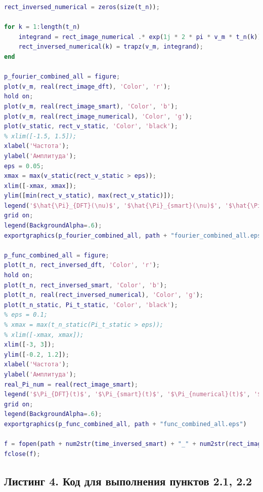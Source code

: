 \documentclass[a4paper]{article}
\begin{document}
\begin{lstlisting}[caption={Код для построения графиков для пункта 1.3}, language=matlab]
rect_inversed_numerical = zeros(size(t_n));

for k = 1:length(t_n)
    integrand = rect_image_numerical .* exp(1j * 2 * pi * v_m * t_n(k));
    rect_inversed_numerical(k) = trapz(v_m, integrand);
end

p_fourier_combined_all = figure;
plot(v_m, real(rect_image_dft), 'Color', 'r');
hold on;
plot(v_m, real(rect_image_smart), 'Color', 'b');
plot(v_m, real(rect_image_numerical), 'Color', 'g');
plot(v_static, rect_v_static, 'Color', 'black');
% xlim([-1.5, 1.5]);
xlabel('Частота');
ylabel('Амплитуда');
eps = 0.05;
xmax = max(v_static(rect_v_static > eps));
xlim([-xmax, xmax]);
ylim([min(rect_v_static), max(rect_v_static)]);
legend('$\hat{\Pi}_{DFT}(\nu)$', '$\hat{\Pi}_{smart}(\nu)$', '$\hat{\Pi}_{numerical}(\nu)$', '$\mathrm{sinc}(\pi\nu)$', 'Interpreter', 'latex', 'fontsize', 12)
grid on;
legend(BackgroundAlpha=.6);
exportgraphics(p_fourier_combined_all, path + "fourier_combined_all.eps")

p_func_combined_all = figure;
plot(t_n, rect_inversed_dft, 'Color', 'r');
hold on;
plot(t_n, rect_inversed_smart, 'Color', 'b');
plot(t_n, real(rect_inversed_numerical), 'Color', 'g');
plot(t_n_static, Pi_t_static, 'Color', 'black');
% eps = 0.1;
% xmax = max(t_n_static(Pi_t_static > eps));
% xlim([-xmax, xmax]);
xlim([-3, 3]);
ylim([-0.2, 1.2]);
xlabel('Частота');
ylabel('Амплитуда');
real_Pi_num = real(rect_image_smart);
legend('$\Pi_{DFT}(t)$', '$\Pi_{smart}(t)$', '$\Pi_{numerical}(t)$', '$\Pi(t)$', 'Interpreter', 'latex', 'fontsize', 12)
grid on;
legend(BackgroundAlpha=.6);
exportgraphics(p_func_combined_all, path + "func_combined_all.eps")

f = fopen(path + num2str(time_inversed_smart) + "_" + num2str(rect_image_time) + "_" + num2str(rect_image_numerical_time), 'w' );  
fclose(f);
\end{lstlisting}

\subsection*{Листинг 4. Код для выполнения пунктов 2.1, 2.2}
\end{document}
